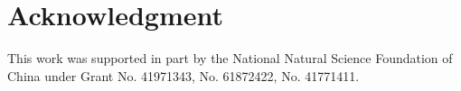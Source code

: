 \documentclass[journal,transmag,11pt]{IEEEtran}
\begin{document}
%



\section*{Acknowledgment}

This work was supported in part by the National Natural Science Foundation of China under Grant No. 41971343, No. 61872422, No. 41771411.

\ifCLASSOPTIONcaptionsoff
  \newpage
\fi







%
\end{document}
